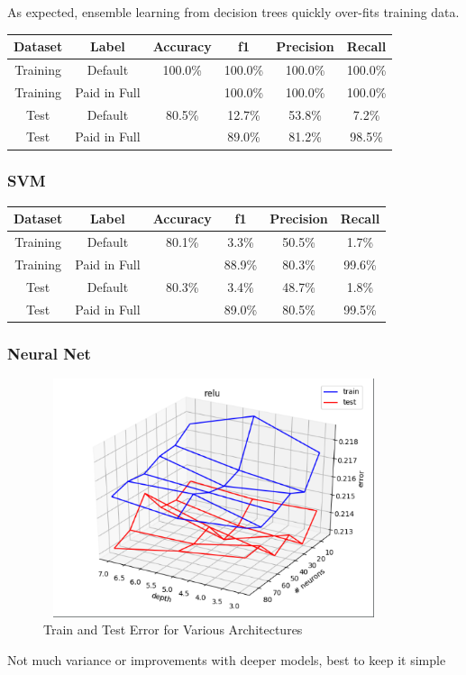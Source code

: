 As expected, ensemble learning from decision trees quickly over-fits training data.

        \begin{center}
        \begin{tabular}{| c | c || c | c | c | c |}
        \hline
        Dataset & Label & Accuracy & f1 & Precision & Recall \\
        \hline \hline
         Training & Default         & 100.0\% & 100.0\% & 100.0\% & 100.0\% \\
         Training & Paid in Full    &       & 100.0\% & 100.0\% & 100.0\% \\
         \hline
         Test & Default             & 80.5\% & 12.7\% & 53.8\% & 7.2\% \\
         Test & Paid in Full        &       & 89.0\% & 81.2\% & 98.5\% \\
         \hline
        \end{tabular}
        \end{center}


\subsubsection{SVM}

        \begin{center}
        \begin{tabular}{| c | c || c | c | c | c |}
        \hline
        Dataset & Label & Accuracy & f1 & Precision & Recall \\
        \hline \hline
         Training & Default         & 80.1\% & 3.3\% & 50.5\% & 1.7\% \\
         Training & Paid in Full    &       & 88.9\% & 80.3\% & 99.6\% \\
         \hline
         Test & Default             & 80.3\% & 3.4\% & 48.7\% & 1.8\% \\
         Test & Paid in Full        &       & 89.0\% & 80.5\% & 99.5\% \\
         \hline
        \end{tabular}
        \end{center}


\subsubsection{Neural Net}

\begin{figure}[h!]
	\centering
	\includegraphics[width=10cm, height=7cm]{neural_nets.png}
	\caption{Train and Test Error for Various Architectures}
	\label{fig:neural_net}
\end{figure}

Not much variance or improvements with deeper models, best to keep it simple
